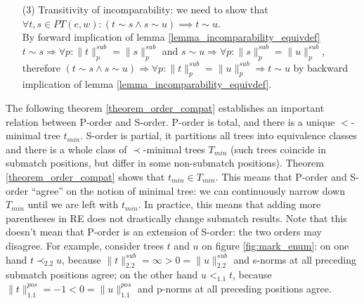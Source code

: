 \documentclass[AMA,STIX1COL]{WileyNJD-v2}
\newcommand{\PT}{PT}
\newcommand{\pnorm}[2]{\|{#1}\|^{pos}_{#2}}
\newcommand{\snorm}[2]{\|{#1}\|^{sub}_{#2}}
\begin{document}
\begin{proofEnd}
\begin{itemize}[itemsep=0.5em, topsep=0.5em]
        \item[(3)]
            Transitivity of incomparability: we need to show that $\forall t, s \in \PT(e,w): (t \sim s \wedge s \sim u) \implies t \sim u$.
            \\[0.5em]
            By forward implication of lemma \ref{lemma_incomparability_equivdef}
            $t \sim s \Rightarrow \forall p : \snorm{t}{p} = \snorm{s}{p}$ and
            $s \sim u \Rightarrow \forall p : \snorm{s}{p} = \snorm{u}{p}$, therefore
            $(t \sim s \wedge s \sim u) \Rightarrow \forall p : \snorm{t}{p} = \snorm{u}{p} \Rightarrow t \sim u$
            by backward implication of lemma \ref{lemma_incomparability_equivdef}.
    \end{itemize}
\end{proofEnd}

The following theorem \ref{theorem_order_compat} establishes an important relation between P-order and S-order.
P-order is total, and there is a unique $<$-minimal tree $t_{min}$.
S-order is partial, it partitions all trees into equivalence classes
and there is a whole class of $\prec$-minimal trees $T_{min}$
(such trees coincide in submatch positions, but differ in some non-submatch positions).
Theorem \ref{theorem_order_compat} shows that $t_{min} \in T_{min}$.
This means that P-order and S-order ``agree'' on the notion of minimal tree:
we can continuously narrow down $T_{min}$ until we are left with $t_{min}$.
In practice, this means that adding more parentheses in RE does not drastically change submatch results.
%
Note that this doesn't mean that P-order is an extension of S-order:
the two orders may disagree.
For example, consider trees $t$ and $u$ on figure \ref{fig:mark_enum}:
on one hand $t \prec_{2.2} u$, because $\snorm{t}{2.2} = \infty > 0 = \snorm{u}{2.2}$ and s-norms at all preceding submatch positions agree;
on the other hand $u <_{1.1} t$, because $\pnorm{t}{1.1} = -1 < 0 = \pnorm{u}{1.1}$
and p-norms at all preceding positions agree.
\end{document}
